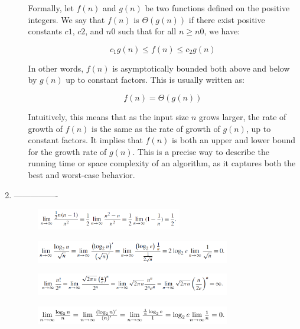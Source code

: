 \documentclass{article}
\begin{document}
\begin{enumerate}
\begin{enumerate}
    Formally, let $f(n)$ and $g(n)$ be two functions defined on the positive integers. We say that $f(n)$ is $\Theta(g(n))$ if there exist positive constants $c1$, $c2$, and $n0$ such that for all $n \geq n0$, we have:
    
    $$c_1 g(n) \leq f(n) \leq c_2 g(n)$$
    
    In other words, $f(n)$ is asymptotically bounded both above and below by $g(n)$ up to constant factors. This is usually written as:
    
    $$f(n) = \Theta(g(n))$$
    
    Intuitively, this means that as the input size $n$ grows larger, the rate of growth of $f(n)$ is the same as the rate of growth of $g(n)$, up to constant factors. It implies that $f(n)$ is both an upper and lower bound for the growth rate of $g(n)$. This is a precise way to describe the running time or space complexity of an algorithm, as it captures both the best and worst-case behavior.

\end{enumerate}

\item ---------------- 

\begin{figure}[!ht]
    \centering
    \includegraphics*[width=0.6\textwidth]{ex_1_limit.png}
\end{figure}

\begin{figure}[!ht]
    \centering
    \includegraphics*[width=0.8\textwidth]{ex_2_limit.png}
\end{figure}

\begin{figure}[!ht]
    \centering
    \includegraphics*[width=0.8\textwidth]{ex_3_limit.png}
\end{figure}

\begin{figure}[!ht]
    \centering
    \includegraphics*[width=0.8\textwidth]{ex_4_limit.png}
\end{figure}


\end{enumerate}
\end{document}
